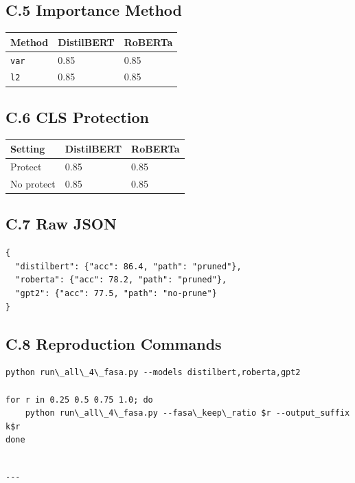 \subsection{C.5 Importance Method}

\begin{table}[H]
\centering
\small
\begin{tabular}{lll}
\toprule
\textbf{Method} & \textbf{DistilBERT} & \textbf{RoBERTa} \\
\midrule
\texttt{var} & 0.85 & 0.85 \\
\texttt{l2} & 0.85 & 0.85 \\
\bottomrule
\end{tabular}
\end{table}

\subsection{C.6 CLS Protection}

\begin{table}[H]
\centering
\small
\begin{tabular}{lll}
\toprule
\textbf{Setting} & \textbf{DistilBERT} & \textbf{RoBERTa} \\
\midrule
Protect & 0.85 & 0.85 \\
No protect & 0.85 & 0.85 \\
\bottomrule
\end{tabular}
\end{table}

\subsection{C.7 Raw JSON}

\begin{lstlisting}
{
  "distilbert": {"acc": 86.4, "path": "pruned"},
  "roberta": {"acc": 78.2, "path": "pruned"},
  "gpt2": {"acc": 77.5, "path": "no-prune"}
}
\end{lstlisting}

\subsection{C.8 Reproduction Commands}

\begin{lstlisting}
python run\_all\_4\_fasa.py --models distilbert,roberta,gpt2

for r in 0.25 0.5 0.75 1.0; do
    python run\_all\_4\_fasa.py --fasa\_keep\_ratio $r --output_suffix k$r
done
\end{lstlisting}
\begin{lstlisting}

---
\end{lstlisting}

